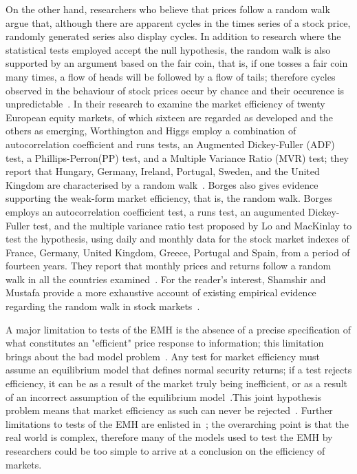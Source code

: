 \documentclass[13pt]{report}
\begin{document}
On the other hand, researchers who believe that prices follow a random walk argue that, although there are apparent cycles in the times series of a stock price, randomly generated series also display cycles. In addition to research where the statistical tests employed accept the null hypothesis, the random walk is also supported by an argument based on the fair coin, that is, if one tosses a fair coin many times, a flow of heads will be followed by a flow of tails; therefore cycles observed in the behaviour of stock prices occur by chance and their occurence is unpredictable~\cite{houthakker1996economics}. In their research to examine the market efficiency of twenty European equity markets, of which sixteen are regarded as developed and the others as emerging, Worthington and Higgs employ a combination of autocorrelation coefficient and runs tests, an Augmented Dickey-Fuller
(ADF) test, a Phillips-Perron(PP) test, and a Multiple Variance Ratio (MVR) test; they report that Hungary, Germany, Ireland, Portugal, Sweden, and the United Kingdom are characterised by a random walk~\cite{worthington2004random}. Borges also gives evidence supporting the weak-form market efficiency, that is, the random walk. Borges employs an autocorrelation coefficient test, a runs test, an augumented Dickey-Fuller test, and the multiple variance ratio test proposed by Lo and MacKinlay to test the hypothesis, using daily and monthly data for the stock market indexes of France, Germany, United Kingdom, Greece, Portugal and Spain, from a period of fourteen years. They report that monthly prices and returns follow a random walk in all the countries examined~\cite{borges2010efficient}. For the reader's interest, Shamshir and Mustafa provide a more exhaustive account of existing empirical evidence regarding the random walk in stock markets~\cite{shamshirefficiency}.\par

A major limitation to tests of the EMH is the absence of a precise specification of what constitutes an "efficient" price response to information; this limitation brings about the bad model problem~\cite{ball2009global}. Any test for market efficiency must assume an equilibrium model that defines normal security returns; if a test rejects efficiency, it can be as a result of the market truly being inefficient, or as a result of an incorrect assumption of the equilibrium model~\cite{campbell1997econometrics}.This joint hypothesis problem means that market efficiency as such can never be rejected~\cite{campbell1997econometrics}. Further limitations to tests of the EMH are enlisted in~\cite{campbell1997econometrics}; the overarching point is that the real world is complex, therefore many of the models used to test the EMH by researchers could be too simple to arrive at a conclusion on the efficiency of markets.\par
\end{document}
